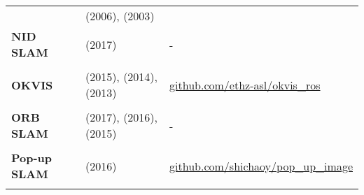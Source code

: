 \documentclass[a4paper,12pt]{scrartcl}
\begin{document}
{\begin{longtable}{l|l|l}
                                                                                                                                  & \cite{Howard2006} (2006), \cite{Liu2003} (2003)                                            &   \\
    \textbf{NID SLAM}                                                                                                             & \cite{Pascoe2017} (2017)                                                                   & - \\
                                                                                                                                  &                                                                                            &   \\ [-3mm]
    \textbf{OKVIS}                                                                                                                & \cite{Leutenegger2015} (2015), \cite{Leutenegger2014} (2014), \cite{Leutenegger2013} (2013)
                                                                                                                                  & {\href{https://github.com/ethz-asl/okvis_ros}{github.com/ethz-asl/okvis\_ros}}            \\
                                                                                                                                  &                                                                                            &   \\ [-3mm]
    \textbf{ORB SLAM}                                                                                                             & \cite{Mur-Artal2017} (2017), \cite{Mur-Artal2016a} (2016), \cite{Mur-Artal2015} (2015)     & - \\
                                                                                                                                  &                                                                                            &   \\ [-3mm]
    \textbf{Pop-up SLAM}                                                                                                          & \cite{Yang2016} (2016)
                                                                                                                                  & {\href{https://github.com/shichaoy/pop_up_image}{github.com/shichaoy/pop\_up\_image}}     \\
                                                                                                                                  &                                                                                            &   \\ [-3mm]

\end{longtable}}
\end{document}
